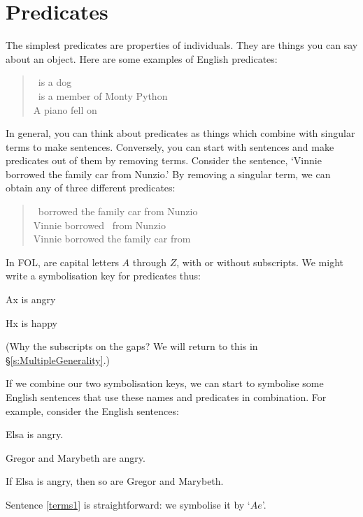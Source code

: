 \section{Predicates}
The simplest predicates are properties of individuals. They are things you can say about an object. Here are some examples of English predicates:
	\begin{quote}
		\blank\ is a dog\\
		\blank\ is a member of Monty Python\\
		A piano fell on \blank
	\end{quote}
In general, you can think about predicates as things which combine with singular terms to make sentences. Conversely, you can start with sentences and make predicates out of them by removing terms. Consider the sentence, `Vinnie borrowed the family car from Nunzio.' By removing a singular term, we can obtain any of three different predicates:
	\begin{quote}
		\blank\ borrowed the family car from Nunzio\\
		Vinnie borrowed \blank\ from Nunzio\\
		Vinnie borrowed the family car from \blank
	\end{quote}
In FOL,  are capital letters $A$ through $Z$, with or without subscripts. We might write a symbolisation key for predicates thus:
	\begin{ekey}
		\item[Ax]  is angry
		\item[Hx]  is happy
	\end{ekey}
        (Why the subscripts on the gaps? We will return to this in \S\ref{s:MultipleGenerality}.)


If we combine our two symbolisation keys, we can start to symbolise some English sentences that use these names and predicates in combination. For example, consider the English sentences:
	\begin{earg}
		\item[\ex{terms1}] Elsa is angry.
		\item[\ex{terms2a}] Gregor and Marybeth are angry.
		\item[\ex{terms2}] If Elsa is angry, then so are Gregor and Marybeth.
	\end{earg}
Sentence \ref{terms1} is straightforward: we symbolise it by `$Ae$'.

